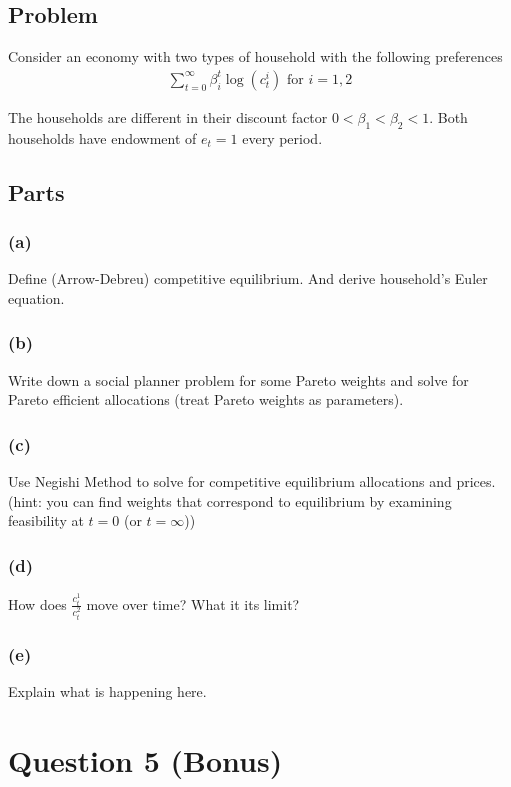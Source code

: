 \documentclass[10pt, a4paper]{article}
\begin{document}
\subsection*{Problem}
Consider an economy with two types of household with the following preferences
\begin{gather*}
  \sum_{t=0}^{\infty} \beta_i^t \log(c^i_t) \text{ for } i = 1,2
\end{gather*}

The households are different in their discount factor $0 < \beta_1 < \beta_2 < 1$. Both households have endowment of $e_t = 1$ every period.

\subsection*{Parts}
\subsubsection*{(a)}
Define (Arrow-Debreu) competitive equilibrium. And derive household's Euler equation.

\subsubsection*{(b)}
Write down a social planner problem for some Pareto weights and solve for Pareto efficient allocations (treat Pareto weights as parameters).

\subsubsection*{(c)}
Use Negishi Method to solve for competitive equilibrium allocations and prices. (hint: you can find weights that correspond to equilibrium by examining feasibility at $t = 0$ (or $t = \infty$))

\subsubsection*{(d)}
How does $\frac{c^1_t}{c^2_t}$ move over time? What it its limit?

\subsubsection*{(e)}
Explain what is happening here.

\section*{Question 5 (Bonus)}
\end{document}
